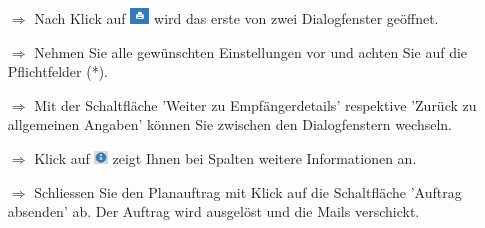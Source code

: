 \documentclass{article}
\begin{document}
\begin{multicols}{2}
\begin{tcolorbox}[colback=blue!5,colframe=blue!40!black,title=Plandruck Dialogfenster]
\begin{itemize}
  \item[$\Longrightarrow$] Nach Klick auf \includegraphics[height=12pt]{Icons/dk_drucken.jpg} wird das erste von zwei Dialogfenster geöffnet.
  \item[$\Longrightarrow$] Nehmen Sie alle gewünschten Einstellungen vor und achten Sie auf die Pflichtfelder (*).
  \item[$\Longrightarrow$] Mit der Schaltfläche 'Weiter zu Empfängerdetails' respektive 'Zurück zu allgemeinen Angaben' können Sie zwischen den Dialogfenstern wechseln.
	\item[$\Longrightarrow$] Klick auf \includegraphics[height=10pt]{Icons/info_blau.jpg} zeigt Ihnen bei Spalten weitere Informationen an.
	\item[$\Longrightarrow$] Schliessen Sie den Planauftrag mit Klick auf die Schaltfläche 'Auftrag absenden' ab. Der Auftrag wird ausgelöst und die Mails verschickt.
\end{itemize}
\end{tcolorbox}

\end{multicols}

\end{document}
